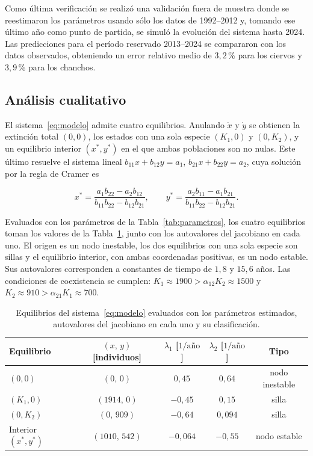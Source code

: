 \documentclass[11pt,a4paper]{article}
\begin{document}
Como última verificación se realizó una validación fuera de muestra donde se
reestimaron los parámetros usando sólo los datos de 1992--2012 y, tomando
ese último año como punto de partida, se simuló la evolución del sistema
hasta 2024. Las predicciones para el período reservado 2013--2024 se
compararon con los datos observados, obteniendo  un error relativo medio de
$3{,}2\,\%$ para los ciervos y $3{,}9\,\%$ para los chanchos.

\subsection{Análisis cualitativo}
\label{sec:cualitativo}

El sistema~\eqref{eq:modelo} admite cuatro equilibrios. Anulando $\dot x$ y
$\dot y$ se obtienen la extinción total $(0,0)$, los estados con una sola
especie $(K_1,0)$ y $(0,K_2)$, y un equilibrio interior $(x^\ast,y^\ast)$
en el que ambas poblaciones son no nulas. Este último resuelve el sistema
lineal $b_{11}x+b_{12}y=a_1$, $b_{21}x+b_{22}y=a_2$, cuya solución por la
regla de Cramer es

\begin{equation}
\label{eq:interior}
x^\ast=\frac{a_1 b_{22}-a_2 b_{12}}{b_{11}b_{22}-b_{12}b_{21}},
\qquad
y^\ast=\frac{a_2 b_{11}-a_1 b_{21}}{b_{11}b_{22}-b_{12}b_{21}}.
\end{equation}

Evaluados con los parámetros de la Tabla~\ref{tab:parametros}, los cuatro
equilibrios toman los valores de la Tabla~\ref{tab:equilibrios}, junto con
los autovalores del jacobiano en cada uno. El origen es un nodo inestable,
los dos equilibrios con una sola especie son sillas y el equilibrio interior,
con ambas coordenadas positivas, es un nodo estable. Sus autovalores
corresponden a constantes de tiempo de $1{,}8$ y $15{,}6$ años. Las
condiciones de coexistencia se cumplen: $K_1\approx1900>\alpha_{12}K_2\approx1500$
y $K_2\approx910>\alpha_{21}K_1\approx700$.

\begin{table}[H]
\centering
\caption{Equilibrios del sistema~\eqref{eq:modelo} evaluados con los
parámetros estimados, autovalores del jacobiano en cada uno y su
clasificación.}
\label{tab:equilibrios}
\begin{tabular}{lcccc}
\toprule
Equilibrio & $(x,\,y)$ [individuos] & $\lambda_1$ [$1/\text{año}$] & $\lambda_2$ [$1/\text{año}$] & Tipo \\
\midrule
$(0,0)$                    & $(0,\,0)$      & $0{,}45$   & $0{,}64$  & nodo inestable \\
$(K_1,0)$                  & $(1914,\,0)$   & $-0{,}45$  & $0{,}15$  & silla \\
$(0,K_2)$                  & $(0,\,909)$    & $-0{,}64$  & $0{,}094$ & silla \\
Interior $(x^\ast,y^\ast)$ & $(1010,\,542)$ & $-0{,}064$ & $-0{,}55$ & nodo estable \\
\bottomrule
\end{tabular}
\end{table}
\end{document}
